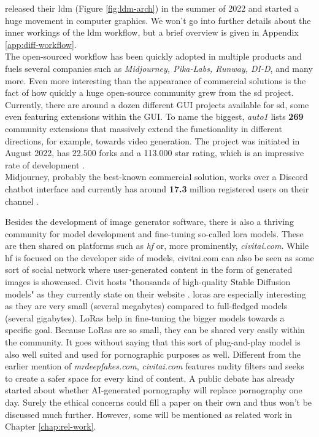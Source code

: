 \documentclass[
  a4paper,  %
  twoside,  %
  bibliography=totoc,
  headsepline,
  cleardoublepage=empty,
  parskip=half,
  draft=false
]{scrbook}
\begin{document}
\citet{rombachHighResolutionImageSynthesis2022} released their \gls{ldm} (Figure \ref{fig:ldm-arch}) in the summer of 2022 and started a huge movement in computer graphics. We won't go into further details about the inner workings of the \gls{ldm} workflow, but a brief overview is given in Appendix \ref{app:diff-workflow}.\\
The open-sourced workflow has been quickly adopted in multiple products and fuels several companies such as \textit{Midjourney, Pika-Labs, Runway, DI-D}, and many more. Even more interesting than the appearance of commercial solutions is the fact of how quickly a huge open-source community grew from the \gls{sd} project. Currently, there are around a dozen different GUI projects available for \gls{sd}, some even featuring extensions within the GUI. To name the biggest, \textit{\gls{auto1}} lists \textbf{269} community extensions that massively extend the functionality in different directions, for example, towards video generation. The project was initiated in August 2022, has 22.500 forks and a 113.000 star rating, which is an impressive rate of development \cite{AUTOMATIC1111StablediffusionwebuiStable}. \\
Midjourney, probably the best-known commercial solution, works over a Discord chatbot interface and currently has around \textbf{17.3} million registered users on their channel \cite{midjourneyJoinMidjourneyDiscord}.

Besides the development of image generator software, there is also a thriving community for model development and fine-tuning so-called \gls{lora} models. These are then shared on platforms such as \textit{\gls{hf}} or, more prominently, \textit{civitai.com}. While \gls{hf} is focused on the developer side of models, civitai.com can also be seen as some sort of social network where user-generated content in the form of generated images is showcased. Civit hosts "thousands of high-quality Stable Diffusion models" as they currently state on their website \cite{CivitaiHomeOpenSource}. \gls{lora}s are especially interesting as they are very small (several megabytes) compared to full-fledged models (several gigabytes). LoRas help in fine-tuning the bigger models towards a specific goal. Because LoRas are so small, they can be shared very easily within the community. It goes without saying that this sort of plug-and-play model is also well suited and used for pornographic purposes as well. Different from the earlier mention of \textit{mrdeepfakes.com}, \textit{civitai.com} features nudity filters and seeks to create a safer space for every kind of content. A public debate has already started about whether AI-generated pornography will replace pornography one day. Surely the ethical concerns could fill a paper on their own and thus won't be discussed much further. However, some will be mentioned as related work in Chapter \ref{chap:rel-work}.
\end{document}
